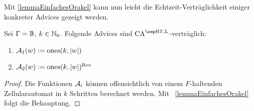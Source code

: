 Mit \cref{lemmaEinfachesOrakel} kann nun leicht die Echtzeit-Verträglichkeit einiger konkreter Advices gezeigt werden.
\begin{corollary}
    Sei $\Gamma = \mathbb{B}$, $k \in \mathbb{N}_0$.
    Folgende Advices sind $\CAM{\CART, \CALeft}$-verträglich:
    \begin{enumerate}
        \item $\mathcal{A}_1(w) := \mathrm{ones}(k, |w|)$ 
        \item $\mathcal{A}_2(w) := \mathrm{ones}(k, |w|)^{\mathrm{Rev}}$
    \end{enumerate}
\end{corollary}
\begin{proof}
    Die Funktionen $\mathcal{A}_i$ können offensichtlich
    von einem $F$-haltenden Zellularautomat in $k$ Schritten berechnet werden.
    Mit ~\cref{lemmaEinfachesOrakel} folgt die Behauptung.
\end{proof}

\begin{comment}
        $Q' := (Q_C \times \finset{ 0, \dots, c })$. Identifiziere $\Sigma' := \Sigma_C$ mit $(\finset{\chr{0}} \times \Sigma_C) \times \finset{0} $. Setze $\#' := (\#_C, 0)$.
        
        $\delta'(\Spvek{\#_C; k_a}, \Spvek{\Spvek{ \gamma_b; c_b}; k_b}, c) := \Spvek{ \Spvek{\chr{1}; c_b}; k_b + 1}$
        
        $\delta'(\Spvek{\Spvek{\gamma_a; c_a}; k_a}, \Spvek{\Spvek{\gamma_b; c_b}; k_b}, c)
            := \Spvek{ \Spvek{ \max \finset{\gamma_a, \gamma_b}; c_b}; k_b + 1}$
        
        $\delta'(a, \Spvek{q_b; k_b}, c) := \Spvek{q_b; k_b + 1}$
\end{comment}



